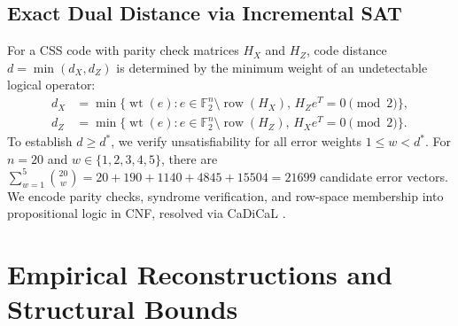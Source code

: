\documentclass[11pt,a4paper]{article}
\begin{document}
\subsection{Exact Dual Distance via Incremental SAT}
\label{sec:sat_method}
For a CSS code with parity check matrices $H_X$ and $H_Z$, code distance $d = \min(d_X, d_Z)$ is determined by the minimum weight of an undetectable logical operator:
\begin{align}
d_X &= \min \{ \operatorname{wt}(e) : e \in \mathbb{F}_2^n \setminus \operatorname{row}(H_X), \, H_Z e^T = 0 \pmod 2 \}, \\
d_Z &= \min \{ \operatorname{wt}(e) : e \in \mathbb{F}_2^n \setminus \operatorname{row}(H_Z), \, H_X e^T = 0 \pmod 2 \}.
\end{align}
To establish $d \ge d^*$, we verify unsatisfiability for all error weights $1 \le w < d^*$. For $n=20$ and $w \in \{1, 2, 3, 4, 5\}$, there are $\sum_{w=1}^5 \binom{20}{w} = 20 + 190 + 1140 + 4845 + 15504 = 21699$ candidate error vectors. We encode parity checks, syndrome verification, and row-space membership into propositional logic in CNF, resolved via CaDiCaL \cite{biere2020cadical, ignatiev2018pysat}.

\section{Empirical Reconstructions and Structural Bounds}
\label{sec:results}
\end{document}
